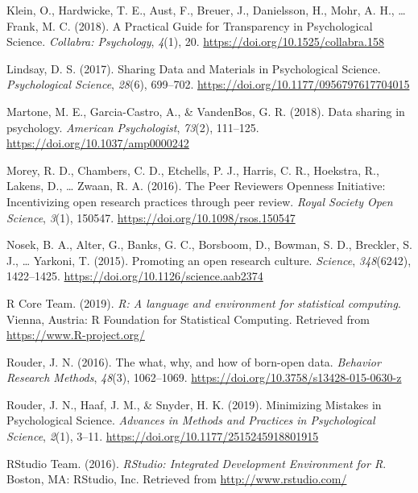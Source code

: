 \documentclass[
  english,
  jou,floatsintext]{apa6}
\newlength{\cslhangindent}
\newenvironment{cslreferences}%
  {\setlength{\parindent}{0pt}%
  \everypar{\setlength{\hangindent}{\cslhangindent}}\ignorespaces}%
  {\par}
\begin{document}
\begin{cslreferences}
\leavevmode\hypertarget{ref-KleinPracticalGuideTransparency2018}{}%
Klein, O., Hardwicke, T. E., Aust, F., Breuer, J., Danielsson, H., Mohr, A. H., \ldots{} Frank, M. C. (2018). A Practical Guide for Transparency in Psychological Science. \emph{Collabra: Psychology}, \emph{4}(1), 20. \url{https://doi.org/10.1525/collabra.158}

\leavevmode\hypertarget{ref-LindsaySharingDataMaterials2017}{}%
Lindsay, D. S. (2017). Sharing Data and Materials in Psychological Science. \emph{Psychological Science}, \emph{28}(6), 699--702. \url{https://doi.org/10.1177/0956797617704015}

\leavevmode\hypertarget{ref-MartoneDatasharingpsychology2018}{}%
Martone, M. E., Garcia-Castro, A., \& VandenBos, G. R. (2018). Data sharing in psychology. \emph{American Psychologist}, \emph{73}(2), 111--125. \url{https://doi.org/10.1037/amp0000242}

\leavevmode\hypertarget{ref-morey_peer_2016}{}%
Morey, R. D., Chambers, C. D., Etchells, P. J., Harris, C. R., Hoekstra, R., Lakens, D., \ldots{} Zwaan, R. A. (2016). The Peer Reviewers Openness Initiative: Incentivizing open research practices through peer review. \emph{Royal Society Open Science}, \emph{3}(1), 150547. \url{https://doi.org/10.1098/rsos.150547}

\leavevmode\hypertarget{ref-nosek_promoting_2015}{}%
Nosek, B. A., Alter, G., Banks, G. C., Borsboom, D., Bowman, S. D., Breckler, S. J., \ldots{} Yarkoni, T. (2015). Promoting an open research culture. \emph{Science}, \emph{348}(6242), 1422--1425. \url{https://doi.org/10.1126/science.aab2374}

\leavevmode\hypertarget{ref-R-base}{}%
R Core Team. (2019). \emph{R: A language and environment for statistical computing}. Vienna, Austria: R Foundation for Statistical Computing. Retrieved from \url{https://www.R-project.org/}

\leavevmode\hypertarget{ref-Rouderwhatwhyhow2016}{}%
Rouder, J. N. (2016). The what, why, and how of born-open data. \emph{Behavior Research Methods}, \emph{48}(3), 1062--1069. \url{https://doi.org/10.3758/s13428-015-0630-z}

\leavevmode\hypertarget{ref-RouderMinimizingMistakesPsychological2019}{}%
Rouder, J. N., Haaf, J. M., \& Snyder, H. K. (2019). Minimizing Mistakes in Psychological Science. \emph{Advances in Methods and Practices in Psychological Science}, \emph{2}(1), 3--11. \url{https://doi.org/10.1177/2515245918801915}

\leavevmode\hypertarget{ref-RStudioTeamRStudioIntegratedDevelopment2016}{}%
RStudio Team. (2016). \emph{RStudio: Integrated Development Environment for R}. Boston, MA: RStudio, Inc. Retrieved from \url{http://www.rstudio.com/}


\end{cslreferences}
\end{document}
